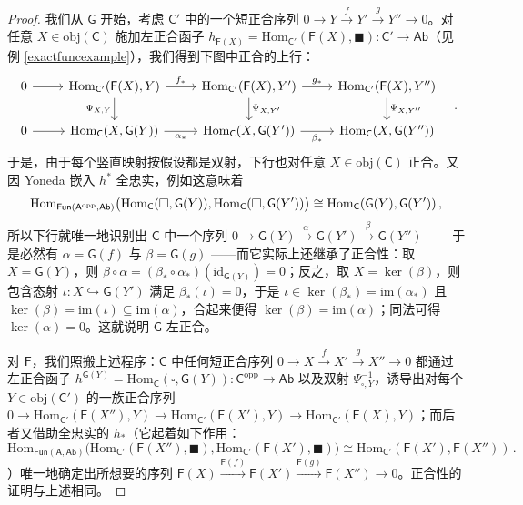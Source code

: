 \begin{proof}
	我们从 $\mathsf{G}$ 开始，考虑 $\mathsf{C}'$ 中的一个短正合序列 $0\rightarrow Y\xrightarrow{f} Y'\xrightarrow{g} Y''\rightarrow 0$。对任意 $X\in\text{obj}(\mathsf{C})$ 施加左正合函子 $h_{\mathsf{F}(X)}=\text{Hom}_{\mathsf{C}'}(\mathsf{F}(X),\blacksquare):\mathsf{C}'\rightarrow\mathsf{Ab}$（见例 \ref{exactfuncexample}），我们得到下图中正合的上行：
	\[
	\begin{tikzcd}
		0\arrow[r] & \text{Hom}_{\mathsf{C}'}(\mathsf{F}(X),Y)\arrow[r,"f_*"]\arrow[d, "\Psi_{X,Y}"'] & \text{Hom}_{\mathsf{C}'}(\mathsf{F}(X),Y')\arrow[r,"g_*"]\arrow[d, "\Psi_{X,Y'}"] & \text{Hom}_{\mathsf{C}'}(\mathsf{F}(X),Y'')\arrow[d, "\Psi_{X,Y''}"] \\
		0\arrow[r] & \text{Hom}_\mathsf{C}(X,\mathsf{G}(Y))\arrow[r, "\alpha_*"'] & \text{Hom}_\mathsf{C}(X,\mathsf{G}(Y'))\arrow[r, "\beta_*"'] & \text{Hom}_\mathsf{C}(X,\mathsf{G}(Y''))
	\end{tikzcd}\quad.
	\]
	于是，由于每个竖直映射按假设都是双射，下行也对任意 $X\in\text{obj}(\mathsf{C})$ 正合。又因 Yoneda 嵌入 $h^*$ 全忠实，例如这意味着
	\[
	\text{Hom}_{\mathsf{Fun}(\mathsf{A}^\textup{opp},\mathsf{Ab})}\big(\text{Hom}_\mathsf{C}(\square,\mathsf{G}(Y)),\text{Hom}_\mathsf{C}(\square,\mathsf{G}(Y'))\big)\cong\text{Hom}_\mathsf{C}(\mathsf{G}(Y),\mathsf{G}(Y'))\,,
	\]
	所以下行就唯一地识别出 $\mathsf{C}$ 中一个序列 $0\rightarrow\mathsf{G}(Y)\xrightarrow{\alpha}\mathsf{G}(Y')\xrightarrow{\beta}\mathsf{G}(Y'')$ ——于是必然有 $\alpha=\mathsf{G}(f)$ 与 $\beta=\mathsf{G}(g)$ ——而它实际上还继承了正合性：取 $X=\mathsf{G}(Y)$，则 $\beta\circ\alpha=(\beta_*\circ\alpha_*)(\text{id}_{\mathsf{G}(Y)})=0$；反之，取 $X=\ker(\beta)$，则包含态射 $\iota:X\hookrightarrow\mathsf{G}(Y')$ 满足 $\beta_*(\iota)=0$，于是 $\iota\in\ker(\beta_*)=\text{im}(\alpha_*)$ 且 $\ker(\beta)=\text{im}(\iota)\subseteq\text{im}(\alpha)$，合起来便得 $\ker(\beta)=\text{im}(\alpha)$；同法可得 $\ker(\alpha)=0$。这就说明 $\mathsf{G}$ 左正合。

	对 $\mathsf{F}$，我们照搬上述程序：$\mathsf{C}$ 中任何短正合序列 $0\rightarrow X\xrightarrow{f} X'\xrightarrow{g} X''\rightarrow 0$ 都通过左正合函子 $h^{\mathsf{G}(Y)}=\text{Hom}_\mathsf{C}(\square,\mathsf{G}(Y)):\mathsf{C}^\text{opp}\rightarrow\mathsf{Ab}$ 以及双射 $\Psi_{\square,Y}^{-1}$，诱导出对每个 $Y\in\text{obj}(\mathsf{C}')$ 的一族正合序列 $0\rightarrow\text{Hom}_{\mathsf{C}'}(\mathsf{F}(X''),Y)\rightarrow\text{Hom}_{\mathsf{C}'}(\mathsf{F}(X'),Y)\rightarrow\text{Hom}_{\mathsf{C}'}(\mathsf{F}(X),Y)$；而后者又借助全忠实的 $h_*$（它起着如下作用：
	\[
	\text{Hom}_{\mathsf{Fun}(\mathsf{A},\mathsf{Ab})}\big(\text{Hom}_{\mathsf{C}'}(\mathsf{F}(X''),\blacksquare),\text{Hom}_{\mathsf{C}'}(\mathsf{F}(X'),\blacksquare)\big)\cong\text{Hom}_{\mathsf{C}'}(\mathsf{F}(X'),\mathsf{F}(X''))\,.
	\]
	）唯一地确定出所想要的序列 $\mathsf{F}(X)\xrightarrow{\mathsf{F}(f)}\mathsf{F}(X')\xrightarrow{\mathsf{F}(g)}\mathsf{F}(X'')\rightarrow 0$。正合性的证明与上述相同。
\end{proof}


\newpage


